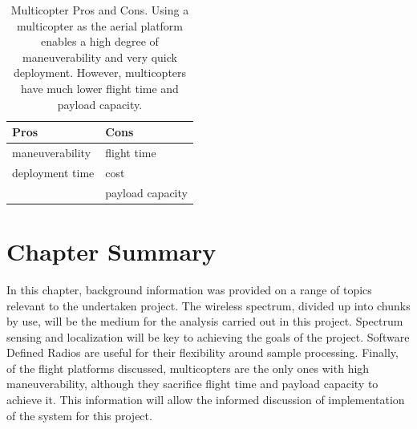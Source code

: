 \begin{table}[ht]
\centering
\caption{Multicopter Pros and Cons. Using a multicopter as the aerial platform enables a high degree of maneuverability and very quick deployment. However, multicopters have much lower flight time and payload capacity.}
\label{table:multi_pc}
\begin{tabular}{l|l}
  Pros & Cons \\ \hline
  maneuverability & flight time \\
  deployment time & cost \\
   & payload capacity \\
\end{tabular}
\end{table}\par

\section{Chapter Summary}
In this chapter, background information was provided on a range of topics relevant to the undertaken project. The wireless spectrum, divided up into chunks by use, will be the medium for the analysis carried out in this project. Spectrum sensing and localization will be key to achieving the goals of the project. Software Defined Radios are useful for their flexibility around sample processing. Finally, of the flight platforms discussed, multicopters are the only ones with high maneuverability, although they sacrifice flight time and payload capacity to achieve it. This information will allow the informed discussion of implementation of the system for this project.
